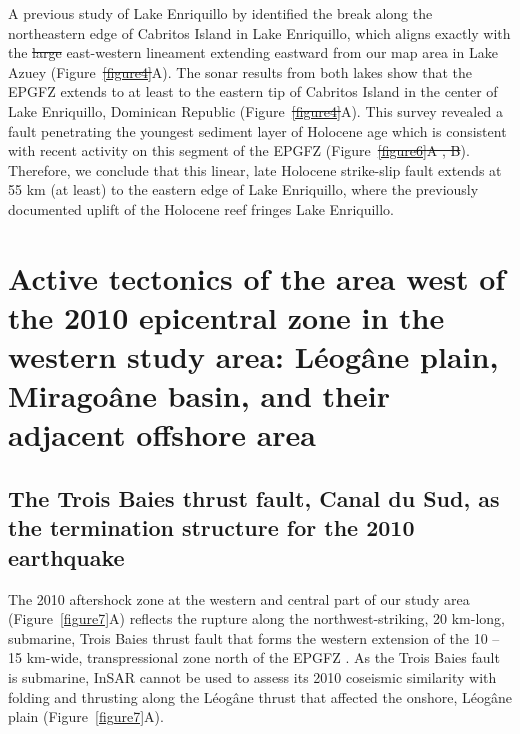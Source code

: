 \documentclass[linenumbers,draft]{agujournal}
\providecommand{\DIFaddtex}[1]{{\protect\color{blue}\uwave{#1}}} %
\providecommand{\DIFdeltex}[1]{{\protect\color{red}\sout{#1}}}                      %
\providecommand{\DIFaddbegin}{} %
\providecommand{\DIFaddend}{} %
\providecommand{\DIFdelbegin}{} %
\providecommand{\DIFdelend}{} %
\providecommand{\DIFadd}[1]{\texorpdfstring{\DIFaddtex{#1}}{#1}} %
\providecommand{\DIFdel}[1]{\texorpdfstring{\DIFdeltex{#1}}{}} %
\begin{document}
A previous study of Lake Enriquillo by \citet{rios2013holocene} identified the break along the northeastern edge of Cabritos Island in Lake Enriquillo, which aligns exactly with the \DIFdelbegin \DIFdel{large }\DIFdelend \DIFaddbegin \DIFadd{prominent, }\DIFaddend east-western lineament extending eastward from our map area in Lake Azuey (Figure~\DIFdelbegin \DIFdel{\ref{figure4}}\DIFdelend \DIFaddbegin \DIFadd{\ref{figure6}}\DIFaddend A). The sonar results from both lakes show that the EPGFZ extends to at least to the eastern tip of Cabritos Island in the center of Lake Enriquillo, Dominican Republic (Figure~\DIFdelbegin \DIFdel{\ref{figure4}}\DIFdelend \DIFaddbegin \DIFadd{\ref{figure6}}\DIFaddend A). This survey revealed a fault penetrating the youngest sediment layer of Holocene age which is consistent with recent activity on this segment of the EPGFZ (Figure~\DIFdelbegin \DIFdel{\ref{figure6}A , B}\DIFdelend \DIFaddbegin \DIFadd{\ref{figure5}A -- D}\DIFaddend ). Therefore, we conclude that this linear, late Holocene strike-slip fault extends at 55 km (at least) to the eastern edge of Lake Enriquillo, where the previously documented \citep{mann1995actively} uplift of the Holocene reef fringes Lake Enriquillo.

\section{Active tectonics of the area west of the 2010 epicentral zone in the western study area: L\'eog\^ane plain, Mirago\^ane basin, and their adjacent offshore area}
\subsection{The Trois Baies thrust fault, Canal du Sud, as the termination structure for the 2010 earthquake}
The 2010 aftershock zone at the western and central part of our study area (Figure~\ref{figure7}A) reflects the rupture along the northwest-striking, 20 km-long, submarine, Trois Baies thrust fault that forms the western extension of the 10 -- 15 km-wide, transpressional zone north of the EPGFZ \DIFaddbegin \DIFadd{\mbox{%
\citep{mercier20112010}}\hspace{0pt}%
}\DIFaddend . As the Trois Baies fault is submarine, InSAR cannot be used to assess its 2010 coseismic similarity with folding and thrusting along the L\'eog\^ane thrust that affected the onshore, L\'eog\^ane plain (Figure~\ref{figure7}A). 
\end{document}
